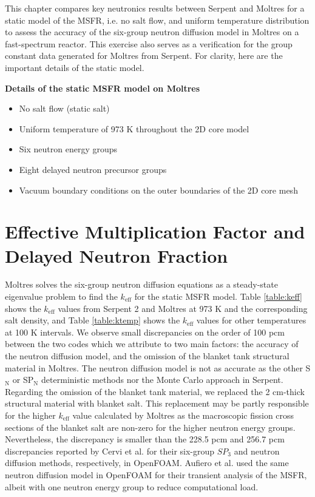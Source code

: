 This chapter compares key neutronics results between Serpent and Moltres
for a static model of the \gls{MSFR}, i.e. no salt flow, and uniform
temperature distribution to assess the accuracy of the
six-group neutron diffusion model in Moltres on a fast-spectrum reactor. This
exercise also serves as a verification for the group constant data
generated for Moltres from Serpent. For clarity, here are the important
details of the static model.

\textbf{Details of the static \gls{MSFR} model on Moltres}
\begin{itemize}
    \item No salt flow (static salt)
    \item Uniform temperature of 973 K throughout the 2D core model
    \item Six neutron energy groups
    \item Eight delayed neutron precursor groups
    \item Vacuum boundary conditions on the outer boundaries of the 2D core
    mesh
\end{itemize}

\section{Effective Multiplication Factor and Delayed Neutron Fraction}

Moltres solves the six-group neutron diffusion equations as a
steady-state eigenvalue problem to find the $k_{\text{eff}}$ for the static
\gls{MSFR} model. Table
\ref{table:keff} shows the $k_{\text{eff}}$ values from Serpent 2 and Moltres
at 973 K and the corresponding salt density, and Table \ref{table:ktemp} shows
the $k_{\text{eff}}$ values for other temperatures at 100 K intervals. We
observe small discrepancies on the order of 100 pcm between the two codes
which we attribute to two main factors: the accuracy of the neutron diffusion
model, and the omission of the blanket tank structural material in Moltres.
The neutron diffusion model is not as accurate as the other S$_{\text{N}}$ or
SP$_{\text{N}}$ deterministic methods nor the Monte Carlo approach in Serpent.
Regarding the omission of the blanket tank material, we replaced the
2 cm-thick structural material with blanket salt. This replacement may be
partly responsible for the higher $k_{\text{eff}}$ value calculated by Moltres
as the macroscopic fission cross sections of the blanket salt are non-zero for
the higher neutron energy groups. Nevertheless, the discrepancy is smaller
than the 228.5 pcm and 256.7 pcm discrepancies reported by Cervi et al.
\cite{cervi_development_2019} for their six-group $SP_3$ and neutron
diffusion methods, respectively, in OpenFOAM. Aufiero et al.
\cite{aufiero_development_2014} used the same neutron diffusion model in
OpenFOAM for their transient analysis of the \gls{MSFR}, albeit with one
neutron energy group to reduce computational load.

